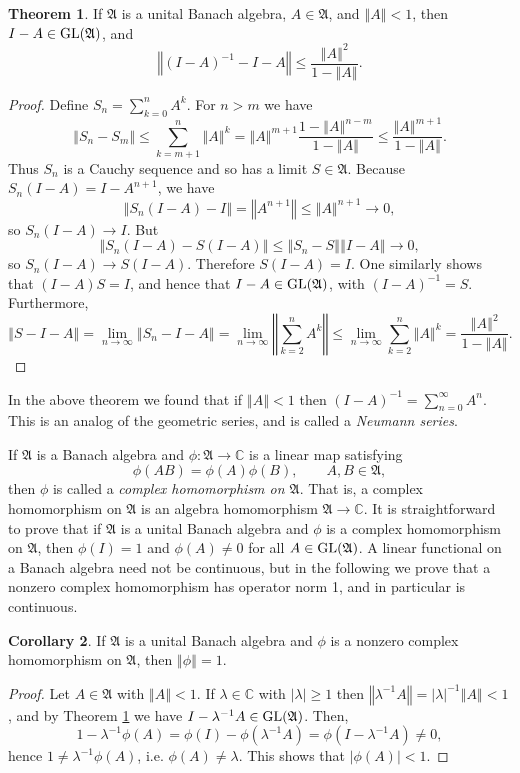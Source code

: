 \documentclass{article}
\newcommand{\GL}{\ensuremath\mathrm{GL}}
\newcommand{\norm}[1]{\left\Vert #1 \right\Vert}
\theoremstyle{definition}
\newtheorem{theorem}{Theorem}
\newtheorem{corollary}[theorem]{Corollary}
\theoremstyle{definition}
\begin{document}
 \begin{theorem}
 If $\mathfrak{A}$ is a unital Banach algebra, $A \in \mathfrak{A}$, and $\norm{A} < 1$, then $I-A \in \GL(\mathfrak{A})$, and
 \[
 \norm{(I-A)^{-1}-I-A} \leq \frac{\norm{A}^2}{1-\norm{A}}.
 \]
 \label{neumann}
 \end{theorem}
 \begin{proof}
 Define $S_n=\sum_{k=0}^n A^k$. For $n > m$ we have
 \[
 \norm{S_n-S_m} \leq \sum_{k=m+1}^n \norm{A}^k = \norm{A}^{m+1} \frac{1-\norm{A}^{n-m}}{1-\norm{A}} \leq \frac{\norm{A}^{m+1}}{1-\norm{A}}.
 \]
 Thus $S_n$ is a Cauchy sequence and so has a limit $S \in \mathfrak{A}$. Because
 $ S_n (I-A) = I-A^{n+1}$,
 we have
 \[
 \norm{S_n(I-A)-I} = \norm{A^{n+1}} \leq \norm{A}^{n+1} \to 0,
 \]
 so $S_n(I-A) \to I$. But
 \[
 \norm{S_n(I-A) -S(I-A)} \leq \norm{S_n-S}\norm{I-A} \to 0,
 \]
 so $S_n(I-A) \to S(I-A)$. Therefore $S(I-A)=I$. One similarly shows that $(I-A)S=I$, and hence that $I-A \in \GL(\mathfrak{A})$,
 with $(I-A)^{-1}=S$. 
Furthermore,
\[
\norm{S-I-A} = \lim_{n \to \infty} \norm{S_n-I-A} = \lim_{n \to \infty} \norm{\sum_{k=2}^n A^k}
\leq \lim_{n \to \infty} \sum_{k=2}^n \norm{A}^k
=\frac{\norm{A}^2}{1-\norm{A}}.
\]
 \end{proof}
 
 In the above  theorem we found that if $\norm{A}<1$ then $(I-A)^{-1} = \sum_{n=0}^\infty A^n$. This is an analog of the geometric series, and is called
 a {\em Neumann series}. 
 
 If $\mathfrak{A}$ is a Banach algebra and $\phi:\mathfrak{A} \to \mathbb{C}$ is a linear map satisfying
 \[
 \phi(AB)=\phi(A)\phi(B),\qquad A,B \in \mathfrak{A},
 \]
 then $\phi$ is called a {\em complex homomorphism on $\mathfrak{A}$}.
 That is, a complex homomorphism on $\mathfrak{A}$ is an algebra homomorphism $\mathfrak{A} \to \mathbb{C}$. It is straightforward to prove that if $\mathfrak{A}$ is a unital
 Banach algebra and $\phi$ is a complex homomorphism on $\mathfrak{A}$, then $\phi(I)=1$ and $\phi(A) \neq 0$ for all $A \in \GL(\mathfrak{A})$. A linear functional
 on a Banach algebra need not be continuous, but in the following  we prove that a nonzero complex homomorphism has operator norm 1, and in particular is continuous.
 
  \begin{corollary}
 If $\mathfrak{A}$ is a unital Banach algebra and $\phi$ is a nonzero complex homomorphism on $\mathfrak{A}$, then $\norm{\phi}=1$.
 \end{corollary}
 \begin{proof}
 Let $A \in \mathfrak{A}$ with $\norm{A}<1$. If $\lambda \in \mathbb{C}$ with $|\lambda| \geq 1$ then $\norm{\lambda^{-1}A}=|\lambda|^{-1} \norm{A}<1$, and
by Theorem \ref{neumann} we have $I-\lambda^{-1}A \in \GL(\mathfrak{A})$. Then,
\[
1-\lambda^{-1} \phi(A) = \phi(I)-\phi(\lambda^{-1}A) =\phi(I-\lambda^{-1}A) \neq 0,
\]
hence $1 \neq \lambda^{-1} \phi(A)$, i.e. $\phi(A) \neq \lambda$. This shows that $|\phi(A)| < 1$. 
 \end{proof}
\end{document}
